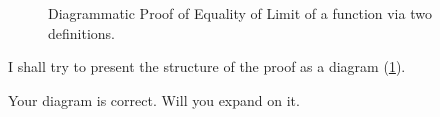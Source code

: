\begin{figure}[H]

\caption{Diagrammatic Proof of Equality of Limit of a function via two definitions.}
\label{fig-30}
\end{figure}


\begin{s}
I shall try to present the structure of the proof as a diagram (\ref{fig-30}).
\end{s}

\begin{p}
Your diagram is correct. Will you expand on it. 
\end{p}

